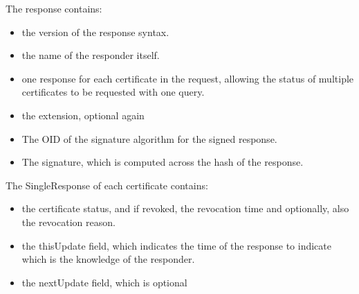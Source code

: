 The response contains:
\begin{itemize}
    \item the version of the response syntax.
    \item the name of the responder itself.
    \item one response for each certificate in the request, allowing
      the status of multiple certificates to be requested with one
      query.
    \item the extension, optional again
    \item The OID of the signature algorithm for the signed response.
    \item The signature, which is computed across the hash of the 
          response.
\end{itemize}
The SingleResponse of each certificate contains:
\begin{itemize}
The certificate identifier
\item the certificate status, and if revoked, the revocation time
    and optionally, also the revocation reason.
\item the thisUpdate field, which indicates the time of the response
  to indicate which is the knowledge of the responder.
\item the nextUpdate field, which is optional
\end{itemize}

